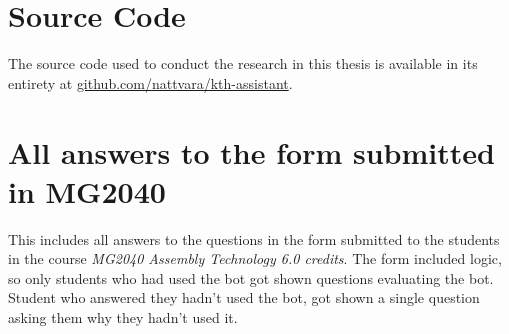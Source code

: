 ﻿\chapter{Source Code}
\label{appendix:source_code}


The source code used to conduct the research in this thesis is available in its entirety at \href{https://github.com/nattvara/kth-assistant}{github.com/nattvara/kth-assistant}.


\chapter{All answers to the form submitted in MG2040}
\label{appendix:mg2040_form}


This includes all answers to the questions in the form submitted to the students in the course \textit{MG2040 Assembly Technology 6.0 credits}. The form included logic, so only students who had used the bot got shown questions evaluating the bot. Student who answered they hadn’t used the bot, got shown a single question asking them why they hadn’t used it.





\cleardoublepage